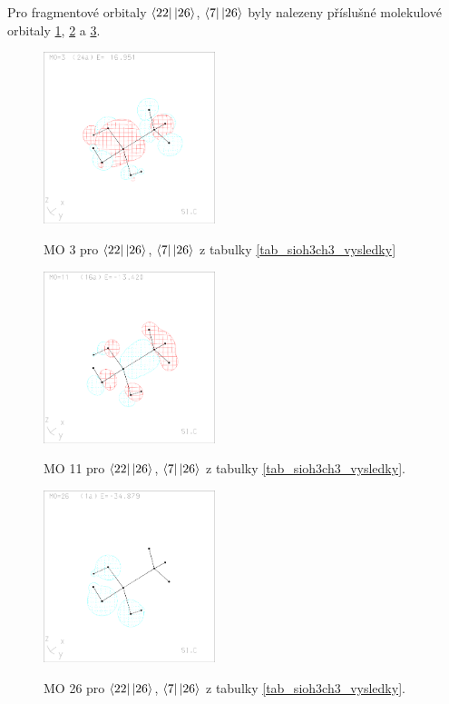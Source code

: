 \documentclass[
  digital, %
  table,   %
  lof,     %
  lot,     %
]{fithesis3}
\begin{document}
 Pro fragmentové orbitaly $\bra{22}\ket{26}$, $\bra{7}\ket{26}$ byly nalezeny příslušné molekulové orbitaly \ref{obr_sioh3ch3_MO_s1_3}, \ref{obr_sioh3ch3_MO_s1_11} a \ref{obr_sioh3ch3_MO_s1_26}.
  
  \begin{figure}[h]
\caption{MO 3 pro $\bra{22}\ket{26}$, $\bra{7}\ket{26}$ z tabulky \ref{tab_sioh3ch3_vysledky}}
  \center
  \includegraphics[width=5cm]{sioh3ch3_obrazky/s1_3.eps}
  \label{obr_sioh3ch3_MO_s1_3}
  \end{figure}

\begin{figure}[h]
\caption{MO 11 pro $\bra{22}\ket{26}$, $\bra{7}\ket{26}$ z tabulky \ref{tab_sioh3ch3_vysledky}.  }
  \center
  \includegraphics[width=5cm]{sioh3ch3_obrazky/s1_11.eps}
  \label{obr_sioh3ch3_MO_s1_11}
  \end{figure}

\begin{figure}[h]
\caption{MO 26 pro $\bra{22}\ket{26}$, $\bra{7}\ket{26}$ z tabulky \ref{tab_sioh3ch3_vysledky}.  }
  \center
  \includegraphics[width=5cm]{sioh3ch3_obrazky/s1_26.eps}
  \label{obr_sioh3ch3_MO_s1_26}
  \end{figure}
  
\end{document}
